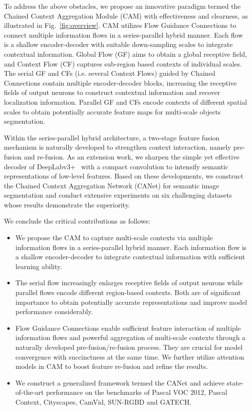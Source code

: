 \documentclass[journal]{IEEEtran}
\begin{document}
To address the above obstacles,  we propose an innovative paradigm termed the Chained Context Aggregation Module (CAM) with effectiveness and clearness, as illustrated in Fig.~\ref{fig:overview}. CAM utilizes Flow Guidance Connections to connect multiple information flows in a series-parallel hybrid manner. Each flow is a shallow encoder-decoder with suitable down-sampling scales to integrate contextual information. Global Flow (GF) aims to obtain a global receptive field, and Context Flow (CF) captures sub-region based contexts of individual scales. The serial GF and CFs (i.e. several Context Flows) guided by Chained Connections contain multiple encoder-decoder blocks, increasing the receptive fields of output neurons to construct contextual information and recover localization information. Parallel GF and CFs encode contexts of different spatial scales to obtain potentially accurate feature maps for multi-scale objects segmentation. 

Within the series-parallel hybrid architecture, a two-stage feature fusion mechanism is naturally developed to strengthen context interaction, namely pre-fusion and re-fusion. As an extension work, we sharpen the simple yet effective decoder of DeepLabv3+~\cite{chen2018encoder} with a compact  convolution to intensify semantic representations of low-level features. Based on these developments, we construct the Chained Context Aggregation Network (CANet) for semantic image segmentation and conduct extensive experiments on six challenging datasets whose results demonstrate the superiority.

We conclude the critical contributions as follows:
\begin{itemize}
    \item We propose the CAM to capture multi-scale contexts via multiple information flows in a series-parallel hybrid manner. Each information flow is a shallow encoder-decoder to integrate contextual information with sufficient learning ability.
    \item The serial flow increasingly enlarges receptive fields of output neurons while parallel flows encode different region-based contexts. Both are of significant importance to obtain potentially accurate representations and improve model performance considerably.
    \item Flow Guidance Connections enable sufficient feature interaction of multiple information flows and powerful aggregation of multi-scale contexts through a naturally developed pre-fusion/re-fusion process. They are crucial for model convergence with succinctness at the same time. We further utilize attention models in CAM to boost feature re-fusion and refine the results.
    \item We construct a generalized framework termed the CANet and achieve state-of-the-art performance on the benchmarks of Pascal VOC 2012, Pascal Context, Cityscapes, CamVid, SUN-RGBD and GATECH.
\end{itemize}
\end{document}
